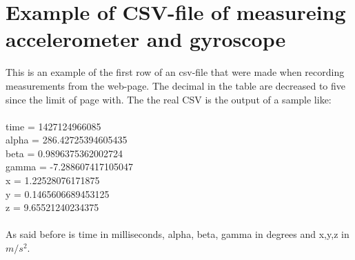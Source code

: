 \chapter{Example of CSV-file of measureing accelerometer and gyroscope}\label{csvraw}
This is an example of the first row of an csv-file that were made when recording measurements from the web-page. The decimal in the table are decreased to five since the limit of page with. The the real CSV is the output of a sample like:\\
\\
time = 1427124966085\\
alpha = 286.42725394605435 \\
beta = 0.9896375362002724 \\
gamma = -7.288607417105047 \\
x = 1.22528076171875 \\
y = 0.1465606689453125 \\
z = 9.65521240234375 \\
\\
As said before is time in milliseconds, alpha, beta, gamma in degrees and x,y,z in $m/s^2$.

